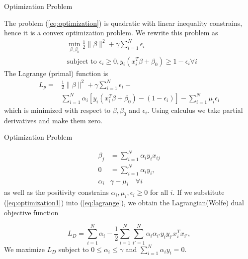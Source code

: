 \documentclass{beamer}
\begin{document}
\begin{frame}{Optimization Problem}
	
	The problem (\ref{eq:optimization}) is quadratic with linear inequality constrains, hence it is a convex optimization problem. We rewrite this problem as
	\begin{equation*}
		\begin{split}
	&\min_{\beta,\beta_0} \frac{1}{2}\| \beta \|^2 + \gamma \sum_{i=1}^N \epsilon_i  \\
	& \textrm{subject to } \epsilon_i \ge 0, y_i ( x_i^T \beta + \beta_0) \ge 1 -\epsilon_i \forall i
		\end{split}
	\end{equation*}
	The Lagrange (primal) function is 
	\begin{equation}
		\begin{split}
L_p=& \frac{1}{2} \|\beta\|^2 + \gamma \sum_{i=1}^N \epsilon_i -  \\
&\sum_{i=1}^{N} \alpha_i [ y_i (x_i^T \beta + \beta_0)-(1-\epsilon_i)] - \sum_{i=1}^{N} \mu_i \epsilon_i
		\end{split}
	\label{eq:lagrange}
	\end{equation}
which is minimized with respect to $\beta, \beta_0$ and $\epsilon_i$. Using calculus we take partial derivatives and make them zero.
\end{frame}

\begin{frame}{Optimization Problem}
	
	\begin{equation}
		\begin{split}
			\beta_j&= \sum_{i=1}^N \alpha_i y_i x_{ij} \\
			0 &= \sum_{i=1}^N \alpha_i y_i,\\
			\alpha_i & \gamma - \mu_i \quad \forall i
		\end{split}
	\label{eq:optimization1}
	\end{equation}
as well as the positivity constrains $\alpha_i,\mu_i,\epsilon_i \ge 0$ for all $i$. If we substitute (\ref{eq:optimization1}) into (\ref{eq:lagrange}), we obtain the Lagrangian(Wolfe) dual objective function 

\begin{equation}
	L_D= \sum_{i=1}^N \alpha_i - \frac{1}{2} \sum_{i=1}^N \sum_{i'=1}^N \alpha_i \alpha_{i'} y_i y_{i'} x_i^T x_{i'},
\label{eq:lagrange2}
\end{equation}
We maximize $L_D$ subject to $0 \le \alpha_i \le \gamma$ and $\sum_{i=1}^N \alpha_i y_i=0$.
\end{frame}
\end{document}
